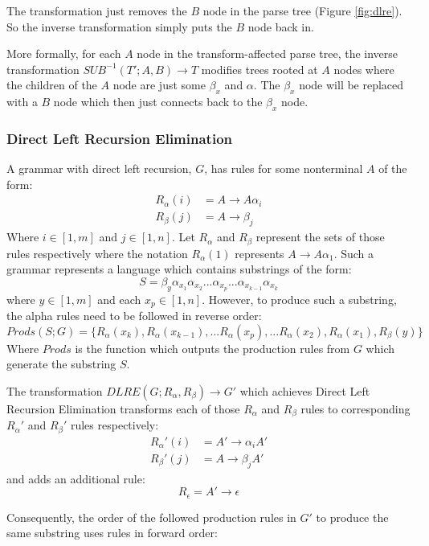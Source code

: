 \documentclass[11pt]{article}
\begin{document}
The transformation just removes the $B$ node in the parse tree (Figure \ref{fig:dlre}).
So the inverse transformation simply puts the $B$ node back in.

More formally, for each $A$ node in the transform-affected parse tree, the inverse transformation $SUB^{-1}(T'; A, B) \rightarrow T$
modifies trees rooted at $A$ nodes where the children of the $A$ node are just some $\beta_x$ and $\alpha$.
The $\beta_x$ node will be replaced with a $B$ node which then just connects back to the $\beta_x$ node.

\subsubsection{Direct Left Recursion Elimination}
A grammar with direct left recursion, $G$, has rules for some nonterminal $A$ of the form:
\begin{align*}
R_\alpha(i) &= A \rightarrow A \alpha_i \\
R_\beta(j) &= A \rightarrow \beta_j
\end{align*}
Where $i \in [1,m]$ and $j \in [1,n]$.
Let $R_\alpha$ and $R_\beta$ represent the sets of those rules respectively where the notation
$R_\alpha(1)$ represents $A \rightarrow A \alpha_1$. 
Such a grammar represents a language which contains substrings of the form:
\[ S = \beta_y \alpha_{x_1} \alpha_{x_2} ... \alpha_{x_p}...\alpha_{x_{k-1}} \alpha_{x_k}\] 
where $y \in [1,m]$ and each $x_p \in [1,n]$.
However, to produce such a substring, the alpha rules need to be followed in reverse order:
\[Prods(S;G) = \{R_\alpha(x_k), R_\alpha(x_{k-1}), ... R_\alpha(x_{p}), ... R_\alpha(x_2), R_\alpha(x_1), R_\beta(y)\}\]
Where $Prods$ is the function which outputs the production rules from $G$ which generate the substring $S$.

The transformation \cite{aho} $DLRE(G; R_\alpha, R_\beta) \rightarrow G'$ which achieves Direct
Left Recursion Elimination transforms each of those $R_\alpha$ and $R_\beta$ rules to corresponding 
$R_\alpha'$ and $R_\beta'$ rules respectively:
\begin{align*}
R_\alpha'(i) &= A' \rightarrow \alpha_i A'\\
R_\beta'(j) &= A \rightarrow \beta_j A'
\end{align*}
and adds an additional rule:
\[ R_\epsilon = A' \rightarrow \epsilon\]

Consequently, the order of the followed production rules in $G'$ to produce the same substring uses rules in forward order:
\end{document}
